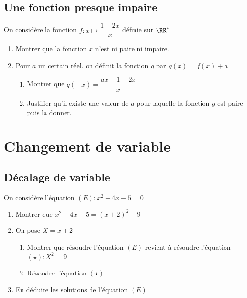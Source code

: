 \documentclass[oneside,12pt]{article}          %
\begin{document}
\subsection{Une fonction presque impaire}
On considère la fonction $f:x\mapsto \dfrac{1-2x}{x}$ définie sur $\RR^*$
\begin{enumerate}
	\item Montrer que la fonction $x$ n'est ni paire ni impaire.
	\item Pour $a$ un certain réel, on définit la fonction $g$ par $g(x)=f(x)+a$
	\begin{enumerate}
		\item Montrer que $g(-x)=\dfrac{ax-1-2x}{x}$
		\item Justifier qu'il existe une valeur de $a$ pour laquelle la fonction $g$ est paire puis la donner.
	\end{enumerate}
\end{enumerate}



\newpage



\section{Changement de variable}

\subsection{Décalage de variable}
On considère l'équation $(E):x^2+4x-5=0$
\begin{enumerate}
	\item Montrer que $x^2+4x-5=(x+2)^2-9$
	\item On pose $X=x+2$
	\begin{enumerate}
		\item Montrer que résoudre l'équation $(E)$ revient à résoudre l'équation $(\star):X^2=9$
		\item Résoudre l'équation $(\star)$
	\end{enumerate}
	\item En déduire les solutions de l'équation $(E)$
\end{enumerate}
\end{document}
